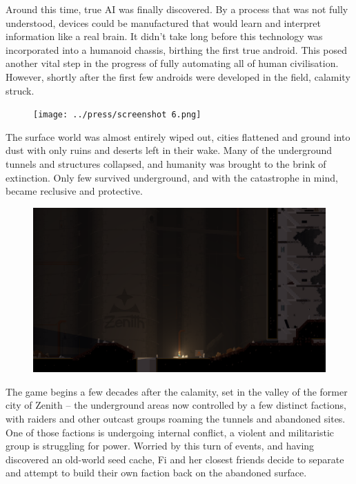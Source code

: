 Around this time, true AI was finally discovered. By a process that was not fully understood, devices could be manufactured that would learn and interpret information like a real brain. It didn't take long before this technology was incorporated into a humanoid chassis, birthing the first true android. This posed another vital step in the progress of fully automating all of human civilisation. However, shortly after the first few androids were developed in the field, calamity struck.

\begin{figure}[h]
  \centering
  \texttt{[image: ../press/screenshot 6.png]}
\end{figure}

The surface world was almost entirely wiped out, cities flattened and ground into dust with only ruins and deserts left in their wake. Many of the underground tunnels and structures collapsed, and humanity was brought to the brink of extinction. Only few survived underground, and with the catastrophe in mind, became reclusive and protective.

\clearpage
\begin{figure}[h]
  \centering
  \includegraphics[width=\textwidth]{../press/screenshot 9.png}
\end{figure}

The game begins a few decades after the calamity, set in the valley of the former city of Zenith -- the underground areas now controlled by a few distinct factions, with raiders and other outcast groups roaming the tunnels and abandoned sites. One of those factions is undergoing internal conflict, a violent and militaristic group is struggling for power. Worried by this turn of events, and having discovered an old-world seed cache, Fi and her closest friends decide to separate and attempt to build their own faction back on the abandoned surface.

